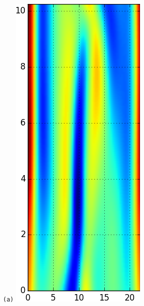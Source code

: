 \documentclass[final,leqno,onefignum,onetabnum]{siamltexmm}
\begin{document}
\begin{figure}[h]
  \centering
  \begin{minipage}{.115\textwidth}
    \centering \small{\texttt{(a)}}
    \includegraphics[width=\textwidth]{ppo1Fv1_64}

\end{minipage}
\end{figure}
\end{document}
